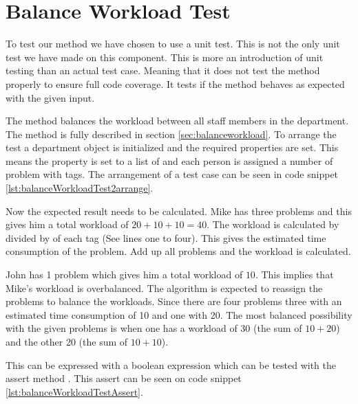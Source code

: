 \chapter{Balance Workload Test}
\label{sec:balWorUniTes}
To test our  method we have chosen to use a unit test.
This is not the only unit test we have made on this component.
This is more an introduction of unit testing than an actual test case.
Meaning that it does not test the method properly to ensure full code coverage.
It tests if the method behaves as expected with the given input. 

The  method balances the workload between all staff members in the department. 
The method is fully described in section \ref{sec:balanceworkload}. 
To arrange the test a department object is initialized and the required properties are set. This means the  property is set to a list of  and each person is assigned a number of problem with tags. 
The arrangement of a test case can be seen in code snippet \ref{lst:balanceWorkloadTest2arrange}.

Now the expected result needs to be calculated. 
Mike has three problems and this gives him a total workload of $20 + 10 + 10 = 40$. The workload is calculated by  divided by  of each tag (See lines one to four).
This gives the estimated time consumption of the problem. Add up all problems and the workload is calculated.

John has 1 problem which gives him a total workload of $10$. 
This implies that Mike's workload is overbalanced. 
The algorithm is expected to reassign the problems to balance the workloads. 
Since there are four problems three with an estimated time consumption of 10 and one with 20.
The most balanced possibility with the given problems is when one has a workload of 30 (the sum of $10 + 20$) and the other 20 (the sum of $10 + 10$). 

This can be expressed with a boolean expression which can be tested with the assert method . 
This assert can be seen on code snippet \ref{lst:balanceWorkloadTestAssert}.

